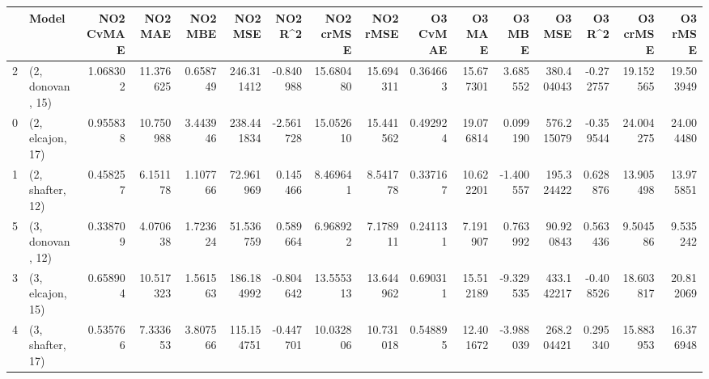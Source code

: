 \begin{tabular}{llrrrrrrrrrrrrrr}
\toprule
{} &             Model &  NO2 CvMAE &    NO2 MAE &   NO2 MBE &     NO2 MSE &   NO2 R\textasciicircum2 &  NO2 crMSE &   NO2 rMSE &  O3 CvMAE &     O3 MAE &    O3 MBE &      O3 MSE &    O3 R\textasciicircum2 &   O3 crMSE &    O3 rMSE \\
\midrule
2 &  (2, donovan, 15) &   1.068302 &  11.376625 &  0.658749 &  246.311412 & -0.840988 &  15.680480 &  15.694311 &  0.364663 &  15.677301 &  3.685552 &  380.404043 & -0.272757 &  19.152565 &  19.503949 \\
0 &  (2, elcajon, 17) &   0.955838 &  10.750988 &  3.443946 &  238.441834 & -2.561728 &  15.052610 &  15.441562 &  0.492924 &  19.076814 &  0.099190 &  576.215079 & -0.359544 &  24.004275 &  24.004480 \\
1 &  (2, shafter, 12) &   0.458257 &   6.151178 &  1.107766 &   72.961969 &  0.145466 &   8.469641 &   8.541778 &  0.337167 &  10.622201 & -1.400557 &  195.324422 &  0.628876 &  13.905498 &  13.975851 \\
5 &  (3, donovan, 12) &   0.338709 &   4.070638 &  1.723624 &   51.536759 &  0.589664 &   6.968922 &   7.178911 &  0.241131 &   7.191907 &  0.763992 &   90.920843 &  0.563436 &   9.504586 &   9.535242 \\
3 &  (3, elcajon, 15) &   0.658904 &  10.517323 &  1.561563 &  186.184992 & -0.804642 &  13.555313 &  13.644962 &  0.690311 &  15.512189 & -9.329535 &  433.142217 & -0.408526 &  18.603817 &  20.812069 \\
4 &  (3, shafter, 17) &   0.535766 &   7.333653 &  3.807566 &  115.154751 & -0.447701 &  10.032806 &  10.731018 &  0.548895 &  12.401672 & -3.988039 &  268.204421 &  0.295340 &  15.883953 &  16.376948 \\
\bottomrule
\end{tabular}
